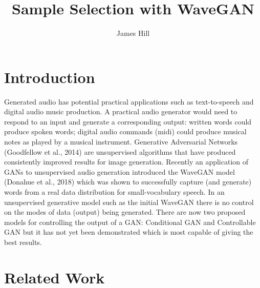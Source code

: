 \documentclass{article}
\title{Sample Selection with WaveGAN}
\author{James Hill}
\date{}
\begin{document}
\maketitle

\section{Introduction}

Generated audio has potential practical applications such as text-to-speech and digital audio music production.
\newline
\newline
A practical audio generator would need to respond to an input and generate a corresponding output: written words could produce spoken words; digital audio commands (midi) could produce musical notes as played by a musical instrument.
\newline
\newline
Generative Adversarial Networks (Goodfellow et al., 2014) are unsupervised algorithms that have produced consistently improved results for image generation.
\newline
\newline
Recently an application of GANs to unsupervised audio generation introduced the WaveGAN model (Donahue et al., 2018) which was shown to successfully capture (and generate) words from a real data distribution for small-vocabulary speech.
\newline
\newline
In an unsupervised generative model such as the initial WaveGAN there is no control on the modes of data (output) being generated.
\newline
\newline
There are now two proposed models for controlling the output of a GAN: Conditional GAN and Controllable GAN but it has not yet been demonstrated which is most capable of giving the best results.

\section{Related Work}
\end{document}
